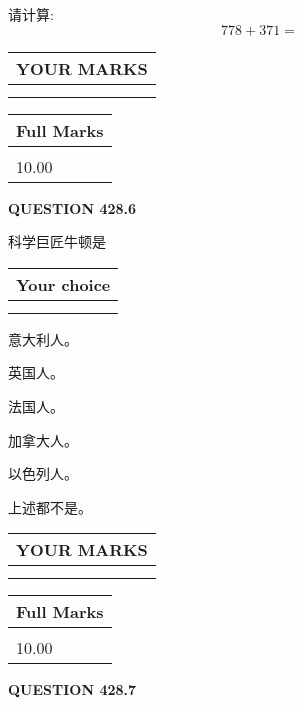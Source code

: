 \documentclass{ctexart}
\begin{document}
  
 
请计算:
\begin{equation}
778 +  %
371 = \nonumber
\end{equation}
 

 

 
  
\vspace{0.2in}
  
\noindent\begin{tabular}{|l|}
\hline
 YOUR MARKS  \\
\hline
 \\ 
 \\ 
\hline
\end{tabular}
\hspace{0.05in} \begin{tabular}{|l|}
\hline
 Full Marks  \\
\hline
 \\ 
10.00 \\
\hline
\end{tabular}
{\textbf{\Large{QUESTION
428.6 
}}}
  
  
科学巨匠牛顿是
  
  
\noindent\hspace{3.0in} \begin{tabular}{|l|}
\hline
Your choice \\
\hline
 \\ 
 \\ 
\hline
\end{tabular}
  
  
 
 
意大利人。
 
 
英国人。
 
 
法国人。
 
 
加拿大人。
 
 
以色列人。
 
 
 上述都不是。
 
 
  
\vspace{0.2in}
  
\noindent\begin{tabular}{|l|}
\hline
 YOUR MARKS  \\
\hline
 \\ 
 \\ 
\hline
\end{tabular}
\hspace{0.05in} \begin{tabular}{|l|}
\hline
 Full Marks  \\
\hline
 \\ 
10.00 \\
\hline
\end{tabular}
{\textbf{\Large{QUESTION
428.7 
}}}
  
\end{document}
